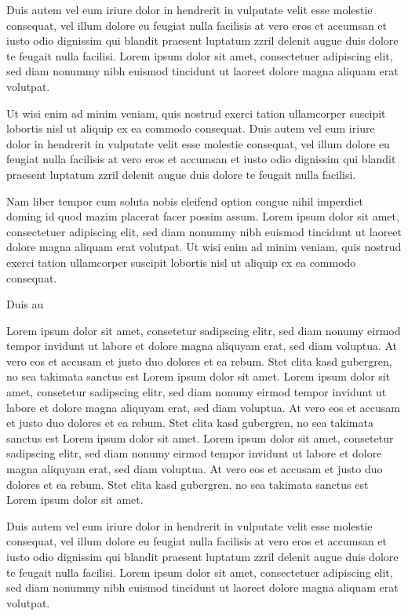 \documentclass{article}
\begin{document}
Duis autem vel eum iriure dolor in hendrerit in vulputate velit esse molestie consequat, vel illum dolore eu feugiat
nulla facilisis at vero eros et accumsan et iusto odio dignissim qui blandit praesent luptatum zzril delenit augue
duis dolore te feugait nulla facilisi. Lorem ipsum dolor sit amet, consectetuer adipiscing elit, sed diam nonummy
nibh euismod tincidunt ut laoreet dolore magna aliquam erat volutpat.

Ut wisi enim ad minim veniam, quis nostrud exerci tation ullamcorper suscipit lobortis nisl ut aliquip ex ea commodo
consequat. Duis autem vel eum iriure dolor in hendrerit in vulputate velit esse molestie consequat, vel illum dolore
eu feugiat nulla facilisis at vero eros et accumsan et iusto odio dignissim qui blandit praesent luptatum zzril
delenit augue duis dolore te feugait nulla facilisi.

Nam liber tempor cum soluta nobis eleifend option congue nihil imperdiet doming id quod mazim placerat facer possim
assum. Lorem ipsum dolor sit amet, consectetuer adipiscing elit, sed diam nonummy nibh euismod tincidunt ut laoreet
dolore magna aliquam erat volutpat. Ut wisi enim ad minim veniam, quis nostrud exerci tation ullamcorper suscipit
lobortis nisl ut aliquip ex ea commodo consequat.

Duis au

Lorem ipsum dolor sit amet, consetetur sadipscing elitr, sed diam nonumy eirmod tempor invidunt ut labore et dolore
magna aliquyam erat, sed diam voluptua. At vero eos et accusam et justo duo dolores et ea rebum. Stet clita kasd
gubergren, no sea takimata sanctus est Lorem ipsum dolor sit amet. Lorem ipsum dolor sit amet, consetetur sadipscing
elitr, sed diam nonumy eirmod tempor invidunt ut labore et dolore magna aliquyam erat, sed diam voluptua. At vero eos
et accusam et justo duo dolores et ea rebum. Stet clita kasd gubergren, no sea takimata sanctus est Lorem ipsum dolor
sit amet. Lorem ipsum dolor sit amet, consetetur sadipscing elitr, sed diam nonumy eirmod tempor invidunt ut labore
et dolore magna aliquyam erat, sed diam voluptua. At vero eos et accusam et justo duo dolores et ea rebum. Stet clita
kasd gubergren, no sea takimata sanctus est Lorem ipsum dolor sit amet.

Duis autem vel eum iriure dolor in hendrerit in vulputate velit esse molestie consequat, vel illum dolore eu feugiat
nulla facilisis at vero eros et accumsan et iusto odio dignissim qui blandit praesent luptatum zzril delenit augue
duis dolore te feugait nulla facilisi. Lorem ipsum dolor sit amet, consectetuer adipiscing elit, sed diam nonummy
nibh euismod tincidunt ut laoreet dolore magna aliquam erat volutpat.
\end{document}
